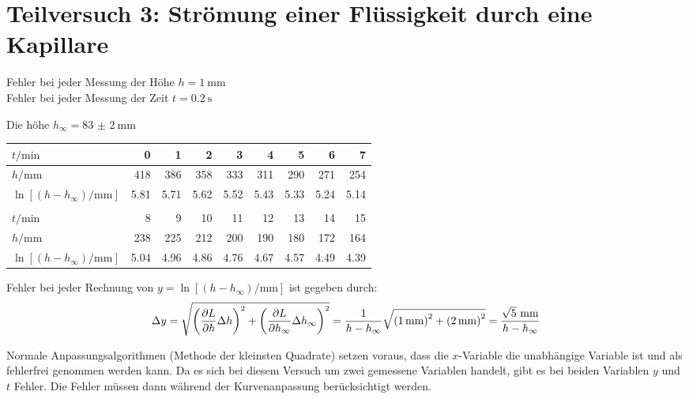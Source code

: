 \setcounter{section}{2}
\section{Teilversuch 3: Strömung einer Flüssigkeit durch eine Kapillare}
	Fehler bei jeder Messung der Höhe $h = \SI{1}{\milli\meter}$\\
	Fehler bei jeder Messung der Zeit $t = \SI{0.2}{\second}$ 

	Die höhe $h_\infty = \SI{83(2)}{\milli\meter}$ 

	\begin{center}
		\begin{tabular}{l *{8}{r}}
			\toprule
			$t / \si{\minute}$ & \num{0} & \num{1} & \num{2} & \num{3} & \num{4} & \num{5} & \num{6} & \num{7}  \\
			\midrule
			$h / \si{\milli\meter}$ & \num{418} & \num{386} & \num{358} & \num{333} & \num{311} & \num{290} & \num{271} & \num{254} \\
			$\ln\left[\left(h - h_\infty\right) / \si{\milli\meter}\right]$ &\num{5.81} & \num{5.71} & \num{5.62} & \num{5.52} & \num{5.43} & \num{5.33} & \num{5.24} & \num{5.14} \\
			\bottomrule \\
			\toprule
			$t / \si{\minute}$ & \num{8} & \num{9} & \num{10} & \num{11} & \num{12} & \num{13} & \num{14} & \num{15} \\
			\midrule 
			$h / \si{\milli\meter}$ & \num{238} & \num{225} & \num{212} & \num{200} & \num{190} & \num{180} & \num{172} & \num{164} \\
			$\ln\left[\left(h - h_\infty\right) / \si{\milli\meter}\right]$ & \num{5.04} & \num{4.96} & \num{4.86} & \num{4.76} & \num{4.67} & \num{4.57} & \num{4.49} & \num{4.39} \\
			\bottomrule
		\end{tabular}
	\end{center}

	Fehler bei jeder Rechnung von $y =\ln\left[\left(h - h_\infty\right) / \si{\milli\meter}\right]$ ist gegeben durch:
	\begin{equation}
		\Delta y = \gausserror{L}{h, h_\infty} = \frac{1}{h-h_\infty} \sqrt{\left(\SI{1}{\milli\meter}\right)^2 + \left(\SI{2}{\milli\meter}\right)^2} = \frac{\sqrt{5}~\si{\milli\meter}}{h-h_\infty}
	\end{equation}

	Normale Anpassungsalgorithmen (Methode der kleinsten Quadrate) setzen voraus, dass die $x$-Variable die unabhängige Variable ist und als fehlerfrei genommen werden kann. Da es sich bei diesem Versuch um zwei gemessene Variablen handelt, gibt es bei beiden Variablen $y$ und $t$ Fehler. Die Fehler müssen dann während der Kurvenanpassung berücksichtigt werden. 

